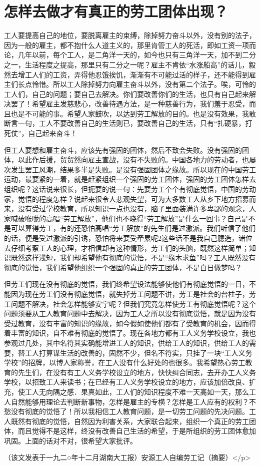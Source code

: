 \section{怎样去做才有真正的劳工团体出现？ }


工人要提高自己的地位，要脱离雇主的束缚，除掉努力奋斗以外，没有别的法子，因为一般的雇主，都不抱什么人道主义的，那里肯管工人的死活，即如工资一项而论，几年以前，每个工人，是二角洋一天的，如今也只有三角洋一天，加不到二分之一，生活程度之提高，那里只有二分之一呢？雇主不肯依“水涨船高”的话儿，毅然去增工人们的工资，弄得他忍饿挨饥，渐渐有不可能过活的样子，还不能得到雇主们长点怜惜。所以工人除掉努力向雇主奋斗以外，没有第二个法子。唉，可怜的工人们，自己的问题；要自己去解决。你们要改善你们的生活，也只有自己起来解决罢了！希望雇主发慈悲心，改善待遇方法，是一种慈善行为，我们羞于忍受，而且也是不可能的事。希望人家鼓吹，以达到劳工解放的目的。也是没有效果，我敢断言一句，工人不要改善自己的生活则已，要改善自己的生活，只有“扎硬暴，打死仗”，自己起来奋斗！

但工人要想和雇主奋斗，应该先有强固的团体，然后不致会失败。没有强固的团体，以此作后援，贸贸然向雇主宣战，没有不失败的。中国各地力的劳动者，也屡次发生罢工风潮，结果多半是失败。是没有强固团体之缘故。所以现在的中国劳工运动，最要紧的一着，就是赶紧组织一个强固的劳工团体，强固的劳工团体怎样去组织呢？这话说来很长，但扼要的说一句：先要劳工个个有彻底觉悟，中国的劳动家，觉悟的程度怎样？说起来很令人悲观失望，可为大多数工人从乡下地方招募而来，没有受过学校教育，所以知识一点也没有，脑子里面装满许多卑鄙的观念，人家喊破喉咙的高唱“劳工解放”，他们也不晓得“劳工解放”是什么一回事？自己是不是可以算得劳工，有的还恐怕高唱“劳工解放”的先生们是过激派。我们听信了他们的话，便是受过激派的引诱，恐怕将来要受牵累呢2这些话不是我自己臆造，诸位去仔细考察工人的心理，才相信却有这种情形，劳工们的头脑，既然这样简单；知识既然这样浅短，我们却希望他有彻底的觉悟，不是“缘木求鱼”吗？工人既然没有彻底的觉悟，我们希望他组织一个强固的真正的劳工团体，不是白日做梦吗？

但劳工们现在没有彻底的觉悟，我们终希望设法能够使他们有彻底觉悟的一日，不能因为现在劳工们没有彻底觉悟，就失掉劳工问题不讲，劳工是社会的台柱子，劳工问题不解决，社会怎样能够安宁呢？但我们究竟怎样使劳工有彻底觉悟呢？这个问题须要从工人教育问题中去解决，因为工人之所以没有彻底觉悟，就是因为没有受过教育，没有丰富的知识的缘故，如今假如使他们都有了受教育的机会，因而得着丰富的知识，自不难有彻底的觉悟了。现在各地方都有工人义务学校设立，我也参观过几处，其中名符其实确能增进工人的知识，供给工人的知识，供给工人的需要，替工人打算谋生活的改善的，固然不少，但名不符实，只挂了一块“工人义务学校”的招牌，以博人家称誉，在工人没有什么好处的也很多。我希望热心劳工教育的先生们，在没有有工人义务学校设立的地方，快快纠合同志，去开办工人义务学校，以招致工人来读书；在已经有工人义务学校设立的地方，应该加倍改良、扩充，使工人无向隅之感．果真如此，工人们的知识程度不难一天高如一天，那么工人自然能够用理论去判断新事物，怎样是雇主的专横？怎样是工人应有的权利？不愁没有彻底的觉悟了！所以我相信工人教育问题，是一切劳工问题的先决问题。工人既然有彻底的觉悟，自然因为利害关系，大家联合起来，组织一个真正的劳工团体，而且觉得不是这样，终没有改善自己生活的希望，于是所组织的劳工团体愈加巩固。上面的话对不对，很希望大家批评。

\begin{flushright}（该文发表于一九二○年十二月湖南大工报）安源工人自编劳工记（摘要）</p>\end{flushright}

